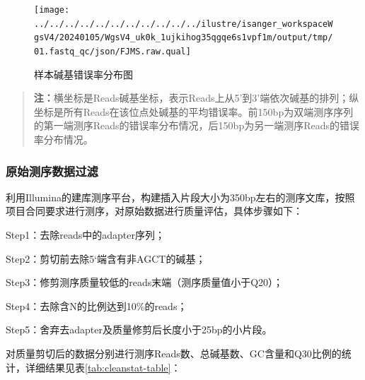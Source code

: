 \documentclass[
  a4paper,
  titlepage]{article}
\begin{document}
\begin{figure}[H]

{\centering \texttt{[image: ../../../../../../../../../../../ilustre/isanger\_workspaceWgsV4/20240105/WgsV4\_uk0k\_1ujkihog35qgqe6s1vpf1m/output/tmp/01.fastq\_qc/json/FJMS.raw.qual]} 

}

\caption{样本碱基错误率分布图}\label{fig:rawqual-plot}
\end{figure}

\begin{quote}
\textbf{注：}横坐标是Reads碱基坐标，表示Reads上从5'到3'端依次碱基的排列；纵坐标是所有Reads在该位点处碱基的平均错误率。前150bp为双端测序序列的第一端测序Reads的错误率分布情况，后150bp为另一端测序Reads的错误率分布情况。
\end{quote}

\hypertarget{ux539fux59cbux6d4bux5e8fux6570ux636eux8fc7ux6ee4}{%
\subsubsection{原始测序数据过滤}\label{ux539fux59cbux6d4bux5e8fux6570ux636eux8fc7ux6ee4}}

利用Illumina的建库测序平台，构建插入片段大小为350bp左右的测序文库，按照项目合同要求进行测序，对原始数据进行质量评估，具体步骤如下：

Step1：去除reads中的adapter序列；

Step2：剪切前去除5`端含有非AGCT的碱基；

Step3：修剪测序质量较低的reads末端（测序质量值小于Q20）；

Step4：去除含N的比例达到10\%的reads；

Step5：舍弃去adapter及质量修剪后长度小于25bp的小片段。

对质量剪切后的数据分别进行测序Reads数、总碱基数、GC含量和Q30比例的统计，详细结果见表\ref{tab:cleanstat-table}：
\end{document}
